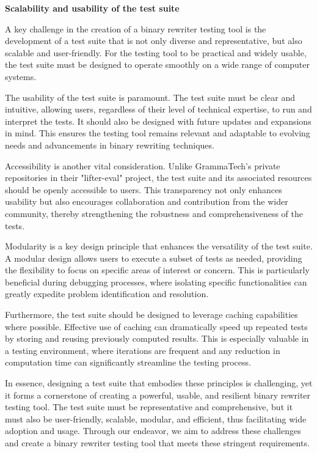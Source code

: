 \documentclass[a4paper,11pt,oneside]{report}
\begin{document}
\textbf{Scalability and usability of the test suite}

A key challenge in the creation of a binary rewriter testing tool is the development of
a test suite that is not only diverse and representative, but also scalable and user-friendly.
For the testing tool to be practical and widely usable, the test suite must be designed to
operate smoothly on a wide range of computer systems.

The usability of the test suite is paramount. The test suite must be clear and
intuitive, allowing users, regardless of their level of technical expertise, to run and interpret
the tests. It should also be designed with future updates and expansions in mind. This
ensures the testing tool remains relevant and adaptable to evolving needs and
advancements in binary rewriting techniques.

Accessibility is another vital consideration. Unlike GrammaTech's private repositories
in their "lifter-eval" project, the test suite and its associated resources should be openly
accessible to users. This transparency not only enhances usability but also encourages
collaboration and contribution from the wider community, thereby strengthening the
robustness and comprehensiveness of the tests.

Modularity is a key design principle that enhances the versatility of the test suite. A
modular design allows users to execute a subset of tests as needed, providing the flexibility
to focus on specific areas of interest or concern. This is particularly beneficial during
debugging processes, where isolating specific functionalities can greatly expedite problem
identification and resolution.

Furthermore, the test suite should be designed to leverage caching capabilities
where possible. Effective use of caching can dramatically speed up repeated tests by storing
and reusing previously computed results. This is especially valuable in a testing
environment, where iterations are frequent and any reduction in computation time can
significantly streamline the testing process.

In essence, designing a test suite that embodies these principles is challenging, yet it
forms a cornerstone of creating a powerful, usable, and resilient binary rewriter testing tool.
The test suite must be representative and comprehensive, but it must also be user-friendly,
scalable, modular, and efficient, thus facilitating wide adoption and usage. Through our
endeavor, we aim to address these challenges and create a binary rewriter testing tool that
meets these stringent requirements.
\end{document}
